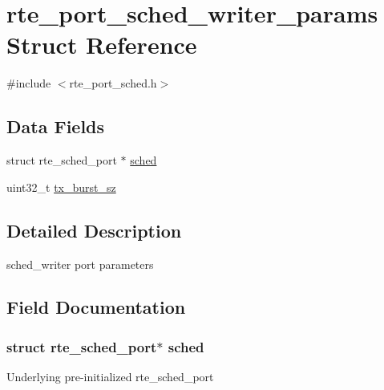 \hypertarget{structrte__port__sched__writer__params}{}\section{rte\+\_\+port\+\_\+sched\+\_\+writer\+\_\+params Struct Reference}
\label{structrte__port__sched__writer__params}


{\ttfamily \#include $<$rte\+\_\+port\+\_\+sched.\+h$>$}

\subsection*{Data Fields}
\begin{DoxyCompactItemize}
\item 
struct rte\+\_\+sched\+\_\+port $\ast$ \hyperlink{structrte__port__sched__writer__params_afac65a177b53f7589c4bfd38423bde94}{sched}
\item 
uint32\+\_\+t \hyperlink{structrte__port__sched__writer__params_a9ed7dbe6241b97c9b68a9491e77c84d0}{tx\+\_\+burst\+\_\+sz}
\end{DoxyCompactItemize}


\subsection{Detailed Description}
sched\+\_\+writer port parameters 

\subsection{Field Documentation}
\hypertarget{structrte__port__sched__writer__params_afac65a177b53f7589c4bfd38423bde94}{}
\subsubsection[{sched}]{\setlength{\rightskip}{0pt plus 5cm}struct rte\+\_\+sched\+\_\+port$\ast$ sched}\label{structrte__port__sched__writer__params_afac65a177b53f7589c4bfd38423bde94}
Underlying pre-\/initialized rte\+\_\+sched\+\_\+port \hypertarget{structrte__port__sched__writer__params_a9ed7dbe6241b97c9b68a9491e77c84d0}{}
